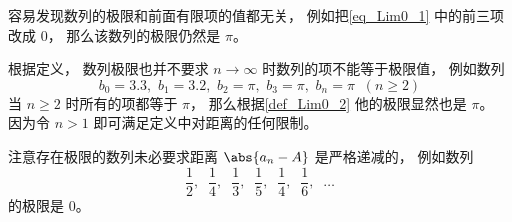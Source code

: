 \begin{example}{}
容易发现数列的极限和前面有限项的值都无关， 例如把\autoref{eq_Lim0_1} 中的前三项改成 $0$， 那么该数列的极限仍然是 $\pi$。
\end{example}

\begin{example}{}
根据定义， 数列极限也并不要求 $n\to \infty$ 时数列的项不能等于极限值， 例如数列
\begin{equation}
b_0 = 3.3,\,\, b_1 = 3.2, \,\, b_2 = \pi, \,\, b_3 = \pi, \,\, b_n = \pi \;\; (n \ge 2)
\end{equation}
当 $n \ge 2$ 时所有的项都等于 $\pi$， 那么根据\autoref{def_Lim0_2} 他的极限显然也是 $\pi$。 因为令 $n > 1$ 即可满足定义中对距离的任何限制。
\end{example}

\begin{example}{}
注意存在极限的数列未必要求距离 $\abs{a_n - A}$ 是严格递减的， 例如数列
\begin{equation}
\frac{1}{2},\;\; \frac{1}{4},\;\; \frac{1}{3},\;\; \frac{1}{5},\;\; \frac{1}{4},\;\; \frac{1}{6},\;\; \dots
\end{equation}
的极限是 $0$。
\end{example}
